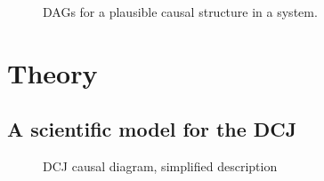 \documentclass[
  authoryear,
  preprint,
  1p]{elsarticle}
\begin{document}
\begin{figure}
\begin{minipage}{0.33\linewidth}

\end{minipage}%
%
\begin{minipage}{0.33\linewidth}

\centering{

\[
\begin{aligned}
  X & := f_{X}(e_{X}) \\
  T & := f_{Z}(X,e_{T}) \\
  Y & := f_{Y}(T,X,e_{Y}) \\
  e_{T} & \perp\!\!\!\perp e_{X} \\
  e_{T} & \perp\!\!\!\perp e_{Y} \\
  e_{X} & \perp\!\!\!\perp e_{Y}
\end{aligned}
\]

}


\end{minipage}%

\caption{\label{fig-example}DAGs for a plausible causal structure in a
system.}

\end{figure}%

\section{Theory}\label{sec-theory}

\subsection{A scientific model for the DCJ}\label{sec-theory-scientific}

\begin{figure}


\caption{\label{fig-SciModel_simp1}DCJ causal diagram, simplified
description}

\end{figure}%
\end{document}
